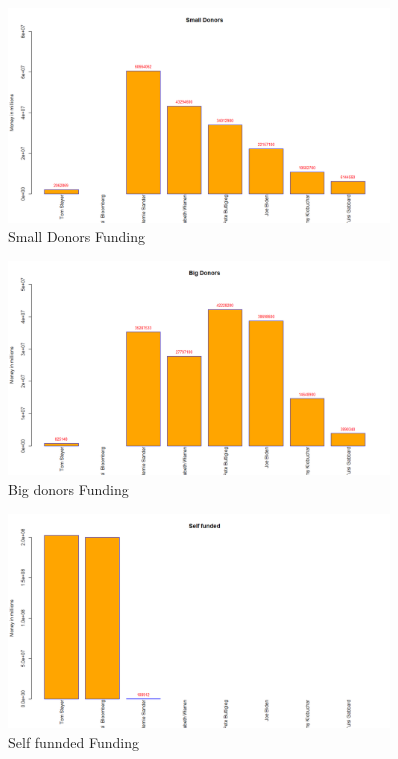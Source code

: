 \begin{figure}[H]
    \centering
    \includegraphics[width=0.9\textwidth]{figures/Small Donors.png}
    \caption{Small Donors Funding}
    \label{Small Donors}
\end{figure}
\begin{figure}[H]
    \centering
    \includegraphics[width=0.9\textwidth]{figures/Bigdonor.png}
    \caption{Big donors Funding}
    \label{Bigdonor}
\end{figure}
\begin{figure}[H]
    \centering
    \includegraphics[width=0.9\textwidth]{figures/Selffunnded.png}
    \caption{Self funnded Funding}
    \label{Selffunnded}
\end{figure}
